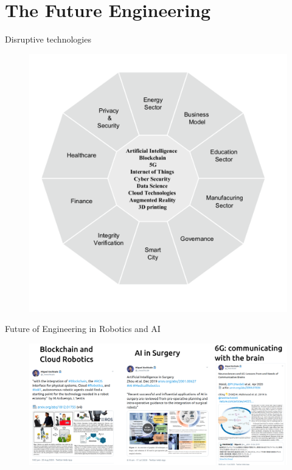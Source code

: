 
\section{The Future Engineering}

{
\begin{frame}{Disruptive technologies}
    \vspace{-00mm}
      \begin{figure}
        \centering
        \includegraphics[width=0.5\linewidth]{./figs/disruptive-tech/versions/drawing-v00.png}
        \caption{}
      \end{figure}
\end{frame}
}


{
\begin{frame}{Future of Engineering in Robotics and AI}
    \vspace{-00mm}
      \begin{figure}
        \centering
        \includegraphics[width=0.99\linewidth]{./figs/future-of-eng/versions/drawing-v00.png}
        \caption{}
      \end{figure}
\end{frame}
}

